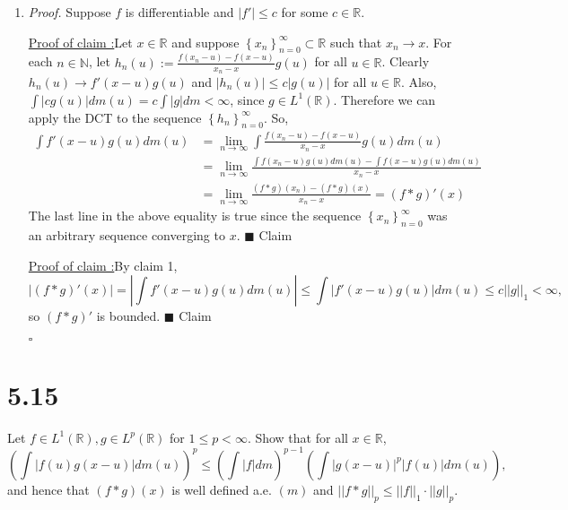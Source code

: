 \documentclass[12pt]{article}
\newcounter{ProofCounter}
\newcounter{ClaimCounter}[ProofCounter]
\newenvironment{Proof}{\stepcounter{ProofCounter}\textit{Proof.}}{\hfill$\square$}
\newenvironment{claim}[1]{\vspace{3mm}\stepcounter{ClaimCounter}\par\noindent\underline{\bf Claim \theClaimCounter:}\space#1}{}
\newenvironment{claimproof}[1]{\par\noindent\underline{Proof of claim \theClaimCounter:}\space#1}{\hfill $\blacksquare$ Claim \theClaimCounter}
\begin{document}
\begin{enumerate}[label=(\alph*)]
\item 
\begin{Proof}
Suppose $f$ is differentiable and $|f'| \leq c$ for some $c \in \mathbb{R}$. 
\begin{claimproof}
Let $x \in \mathbb{R}$ and suppose $\left\{ x_{n}
\right\}_{n=0}^{\infty} \subset \mathbb{R}$ such that $x_{n} \rightarrow x$. For each $n \in \mathbb{N}$, let $h_{n}(u) := \frac{f(x_{n} -u) -
f(x-u)}{x_{n} - x}g(u)$ for all $u \in \mathbb{R}$. Clearly $h_{n}(u) \rightarrow f'(x-u)g(u)$ and $|h_{n}(u)| \leq c|g(u)|$ for all $u \in
\mathbb{R}$. Also, $\int |cg(u)|dm(u) = c \int |g|dm < \infty$,
since $g \in L^{1}(\mathbb{R})$. Therefore we can apply the DCT to the sequence $\left\{ h_{n} \right\}_{n=0}^{\infty}$. So,
\begin{align*}
\int f'(x-u)g(u)dm(u) & = \lim_{n\rightarrow\infty}\int \frac{f(x_{n} - u) - f(x-u)}{x_{n} - x}g(u)dm(u) \\
& = \lim_{n\rightarrow\infty} \frac{ \int f(x_{n} - u)g(u)dm(u) - \int f(x-u)g(u)dm(u)}{x_{n} - x} \\
& = \lim_{n\rightarrow\infty}\frac{ (f*g)(x_{n}) - (f*g)(x) }{x_{n} - x}  = (f*g)'(x)
\end{align*}
The last line in the above equality is true since the sequence $\left\{ x_{n} \right\}_{n=0}^{\infty}$ was an arbitrary sequence converging to $x$.
\end{claimproof}

\begin{claimproof}
By claim 1, 
\[ |(f*g)'(x)| = \left| \int f'(x-u)g(u)dm(u)\right| \leq \int |f'(x-u)g(u)|dm(u) \leq c ||g||_{1} < \infty, \]
so $(f*g)'$ is bounded.
\end{claimproof}

\end{Proof}

\end{enumerate}














\newpage 
\section*{5.15}
Let $f \in L^{1}(\mathbb{R}), g \in L^{p}(\mathbb{R})$ for $1 \leq p < \infty$. Show that for all $x \in \mathbb{R}$,
\[ \left( \int |f(u)g(x-u)|dm(u) \right)^{p} \leq \left( \int |f|dm \right)^{p-1}\left( \int |g(x-u)|^{p}|f(u)|dm(u) \right), \]
and hence that $(f*g)(x)$ is well defined a.e. $(m)$ and $||f*g||_{p} \leq ||f||_{1}\cdot ||g||_{p}$.
\end{document}
